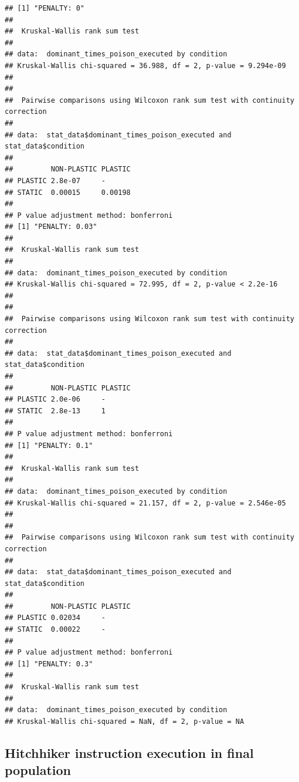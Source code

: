 \documentclass[]{book}
\begin{document}
\begin{verbatim}
## [1] "PENALTY: 0"
## 
##  Kruskal-Wallis rank sum test
## 
## data:  dominant_times_poison_executed by condition
## Kruskal-Wallis chi-squared = 36.988, df = 2, p-value = 9.294e-09
## 
## 
##  Pairwise comparisons using Wilcoxon rank sum test with continuity correction 
## 
## data:  stat_data$dominant_times_poison_executed and stat_data$condition 
## 
##         NON-PLASTIC PLASTIC
## PLASTIC 2.8e-07     -      
## STATIC  0.00015     0.00198
## 
## P value adjustment method: bonferroni 
## [1] "PENALTY: 0.03"
## 
##  Kruskal-Wallis rank sum test
## 
## data:  dominant_times_poison_executed by condition
## Kruskal-Wallis chi-squared = 72.995, df = 2, p-value < 2.2e-16
## 
## 
##  Pairwise comparisons using Wilcoxon rank sum test with continuity correction 
## 
## data:  stat_data$dominant_times_poison_executed and stat_data$condition 
## 
##         NON-PLASTIC PLASTIC
## PLASTIC 2.0e-06     -      
## STATIC  2.8e-13     1      
## 
## P value adjustment method: bonferroni 
## [1] "PENALTY: 0.1"
## 
##  Kruskal-Wallis rank sum test
## 
## data:  dominant_times_poison_executed by condition
## Kruskal-Wallis chi-squared = 21.157, df = 2, p-value = 2.546e-05
## 
## 
##  Pairwise comparisons using Wilcoxon rank sum test with continuity correction 
## 
## data:  stat_data$dominant_times_poison_executed and stat_data$condition 
## 
##         NON-PLASTIC PLASTIC
## PLASTIC 0.02034     -      
## STATIC  0.00022     -      
## 
## P value adjustment method: bonferroni 
## [1] "PENALTY: 0.3"
## 
##  Kruskal-Wallis rank sum test
## 
## data:  dominant_times_poison_executed by condition
## Kruskal-Wallis chi-squared = NaN, df = 2, p-value = NA
\end{verbatim}

\hypertarget{hitchhiker-instruction-execution-in-final-population}{%
\subsection{Hitchhiker instruction execution in final population}\label{hitchhiker-instruction-execution-in-final-population}}
\end{document}
